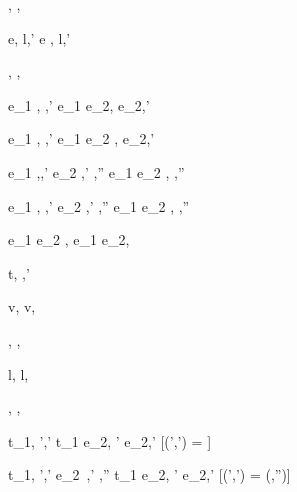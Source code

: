   {}
  {\Enter \tau,\hat{\sigma} \hat{\eval} \Enter \tau,\hat{\sigma}}

  {e,\hat{\sigma}\hat{\eval} l,\hat{\sigma}'}
  {\Update e ,\hat{\sigma}\hat{\eval} \Update l,\hat{\sigma}'}


  {}
  {\Fail,\hat{\sigma} \hat{\eval} \Fail,\hat{\sigma}}


  {e_1 ,\hat{\sigma}\hat{\eval} ,\hat{\sigma}'}
  {e_1 \Then e_2,\hat{\sigma}\hat{\eval} \Then e_2,\hat{\sigma}'}

  {e_1 ,\hat{\sigma}\hat{\eval} ,\hat{\sigma}'}
  {e_1 \Next e_2 ,\hat{\sigma}\hat{\eval}  \Next e_2,\hat{\sigma}'}


  {e_1 ,\hat{\sigma}\hat{\eval},\hat{\sigma}'\Quad
   e_2 ,\hat{\sigma}'\hat{\eval} ,\hat{\sigma}''}
  {e_1 \And e_2 ,\hat{\sigma}\hat{\eval} \And {},\hat{\sigma}''}


  {e_1 ,\hat{\sigma}\hat{\eval} ,\hat{\sigma}'\Quad
   e_2 ,\hat{\sigma}'\hat{\eval} ,\hat{\sigma}''}
  {e_1 \Or e_2 ,\hat{\sigma}\hat{\eval}  \Or {},\hat{\sigma}''}

  {}
  {e_1 \Xor e_2 ,\hat{\sigma}\hat{\eval} e_1 \Xor e_2,\hat{\sigma}}



  {t,\hat{\sigma} \hat{\stride} ,\hat{\sigma}'}


  { }
  {\Edit v,\hat{\sigma} \hat{\stride} \Edit v,\hat{\sigma}}

  { }
  {\Enter \tau,\hat{\sigma} \hat{\stride} \Enter \tau,\hat{\sigma}}

  { }
  {\Update l,\hat{\sigma} \hat{\stride} \Update l,\hat{\sigma}}


  { }
  {\Fail,\hat{\sigma} \hat{\stride} \Fail,\hat{\sigma}}


  {t_1,\hat{\sigma} \hat{\stride} ',\hat{\sigma}'}
  {t_1 \Then e_2,\hat{\sigma} \hat{\stride} ' \Then e_2,\hat{\sigma}'}
  [\Value(',\hat{\sigma}') = \bot]

  {t_1,\hat{\sigma} \hat{\stride} ',\hat{\sigma}' \Quad
   e_2\ ,\hat{\sigma}' \hat{\eval} ,\hat{\sigma}''}
  {t_1 \Then e_2,\hat{\sigma} \hat{\stride} ' \Then e_2,\hat{\sigma}'}
  [\Value(',\hat{\sigma}') =  \land \Failing(,\hat{\sigma}'')]

